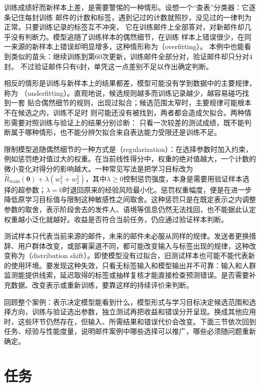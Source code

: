 训练成绩好而新样本上差，是需要警惕的一种情形。设想一个“查表”分类器：它逐条记住每封训练
邮件的计数和标签，遇到记过的计数就照抄，没见过的一律判为正常。只要训练记录的标签互不冲突，
它在训练邮件上全部答对，对新邮件却几乎没有判断力。模型追随了训练样本的偶然细节，在训练
样本上错误很少，在同一来源的新样本上错误却明显增多，这种情形称为（overfitting）。
本例中也能看到类似的苗头：继续训练到第60次更新，训练邮件全部分对，验证邮件却只分对4封。
不过验证邮件只有6封，单凭这一点差别不足以作出确定判断。

相反的情形是训练与新样本上的结果都差，模型可能没有学到数据中的主要规律，称为
（underfitting）。直观地说，候选规则越多而训练记录越少，越容易碰巧找到一套
贴合偶然细节的规则，出现过拟合；候选范围太窄时，主要规律可能根本不在候选之内，训练不足时
则可能还没有被找到，两者都会造成欠拟合。两种情形需要对照训练与验证上的结果分别诊断：
只看一次较差的测试成绩，既不能判断属于哪种情形，也不能分辨欠拟合来自表达能力受限还是训练不足。

限制模型追随偶然细节的一种方式是（regularization）：在选择参数时加入约束，例如惩罚绝对值过大的权重。在当前线性得分中，权重的绝对值越大，一个计数的微小变化对得分的影响越大。一种常见写法是把学习目标改为$\hat{R}_{\mathrm{train}}(\bm{\theta})+\lambda(w_1^2+w_2^2)$，其中$\lambda\geq0$控制惩罚强度，本身是需要用验证样本选择的超参数；$\lambda=0$时退回原来的经验风险最小化。惩罚权重幅度，便是在进一步降低原学习目标值与限制这种敏感性之间取舍。这种惩罚只是在既定表示之内调整参数的取舍，表示阶段舍去的发件人、语境等信息仍然无法找回，也不能据此认定权重越小泛化就越好。收益是否符合当前任务，仍应通过验证样本判断。

测试样本只代表当前来源的邮件，未来的邮件未必服从同样的规律。发送者更换措辞、用户群体改变，或部署渠道不同，都可能改变输入与标签出现的规律，这种改变称为（distribution shift）。即使模型没有过拟合，旧测试样本也可能不能代表新的使用环境。要发现这种失效，只看无标签输入和模型输出并不可靠：输入和人群监测能提供线索，延迟取得的标签或抽样复核才能直接检查预测错误。是否需要补充数据、改变表示或重新训练，要靠这样的持续评价来判断。

回顾整个案例：表示决定模型能看到什么，模型形式与学习目标决定候选范围和选择方向，训练与验证选出参数，独立测试再把收益和错误分开呈现。换成其他应用时，这些环节仍然存在，但输入、所需结果和错误代价会改变。下面三节依次回到任务、经验与性能度量，说明邮件案例中哪些选择可以推广，哪些必须随问题重新确定。

\section{任务}
\label{sec:machine-learning-tasks}

